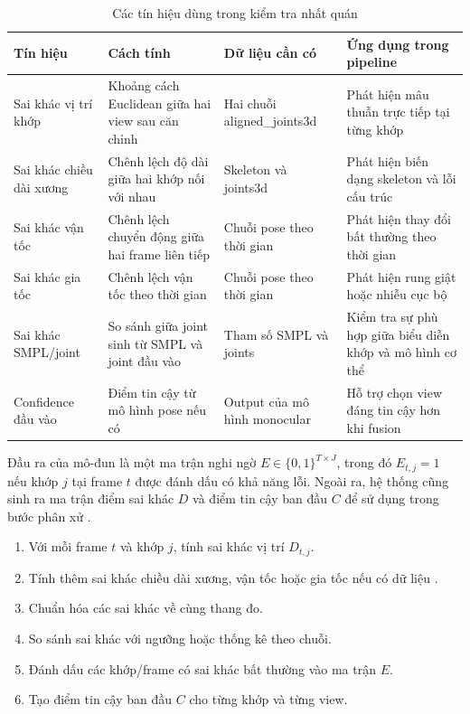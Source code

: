 \documentclass[../DoAn.tex]{subfiles}
\begin{document}
\begin{table}[H]
\centering
\caption{Các tín hiệu dùng trong kiểm tra nhất quán}
\label{tab:consistency_signals}
\begin{tabular}{|p{3.4cm}|p{4.1cm}|p{3.6cm}|p{3.6cm}|}
\hline
\textbf{Tín hiệu} & \textbf{Cách tính} & \textbf{Dữ liệu cần có} & \textbf{Ứng dụng trong pipeline} \\
\hline
Sai khác vị trí khớp & Khoảng cách Euclidean giữa hai view sau căn chỉnh & Hai chuỗi aligned\_joints3d & Phát hiện mâu thuẫn trực tiếp tại từng khớp \cite{manipose2024} \\
\hline
Sai khác chiều dài xương & Chênh lệch độ dài giữa hai khớp nối với nhau & Skeleton và joints3d & Phát hiện biến dạng skeleton và lỗi cấu trúc \cite{keller2023skin} \\
\hline
Sai khác vận tốc & Chênh lệch chuyển động giữa hai frame liên tiếp & Chuỗi pose theo thời gian & Phát hiện thay đổi bất thường theo thời gian \cite{shin2024wham,physcap2020} \\
\hline
Sai khác gia tốc & Chênh lệch vận tốc theo thời gian & Chuỗi pose theo thời gian & Phát hiện rung giật hoặc nhiễu cục bộ \cite{physcap2020} \\
\hline
Sai khác SMPL/joint & So sánh giữa joint sinh từ SMPL và joint đầu vào & Tham số SMPL và joints & Kiểm tra sự phù hợp giữa biểu diễn khớp và mô hình cơ thể \cite{smpl2015,smplify2016} \\
\hline
Confidence đầu vào & Điểm tin cậy từ mô hình pose nếu có & Output của mô hình monocular & Hỗ trợ chọn view đáng tin cậy hơn khi fusion \cite{mtftransformer2023} \\
\hline
\end{tabular}
\end{table}

Đầu ra của mô-đun là một ma trận nghi ngờ $E \in \{0,1\}^{T \times J}$, trong đó $E_{t,j}=1$ nếu khớp $j$ tại frame $t$ được đánh dấu có khả năng lỗi. Ngoài ra, hệ thống cũng sinh ra ma trận điểm sai khác $D$ và điểm tin cậy ban đầu $C$ để sử dụng trong bước phân xử \cite{vu2026multiperspective}.

\begin{enumerate}[leftmargin=*, label=\arabic*.]
    \item Với mỗi frame $t$ và khớp $j$, tính sai khác vị trí $D_{t,j}$.
    \item Tính thêm sai khác chiều dài xương, vận tốc hoặc gia tốc nếu có dữ liệu \cite{keller2023skin,physcap2020}.
    \item Chuẩn hóa các sai khác về cùng thang đo.
    \item So sánh sai khác với ngưỡng hoặc thống kê theo chuỗi.
    \item Đánh dấu các khớp/frame có sai khác bất thường vào ma trận $E$.
    \item Tạo điểm tin cậy ban đầu $C$ cho từng khớp và từng view.
\end{enumerate}
\end{document}
